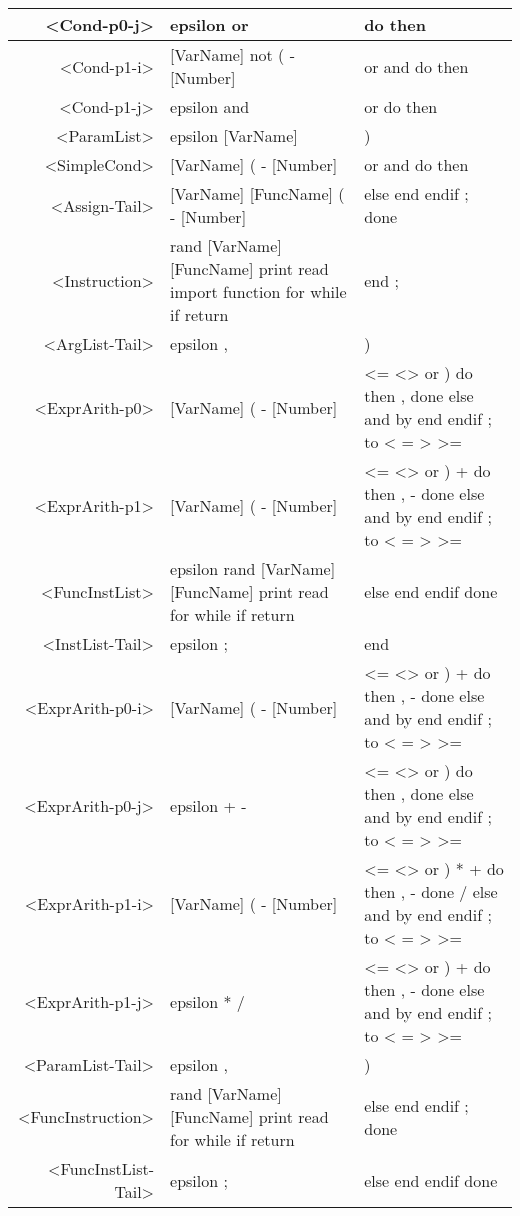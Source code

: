 \begin{longtable}{r p{7cm} p{7cm}}
<Cond-p0-j> & epsilon or  & do then \\ \hline
<Cond-p1-i> & [VarName] not ( - [Number]  & or and do then \\ \hline
<Cond-p1-j> & epsilon and  & or do then \\ \hline
<ParamList> & epsilon [VarName]  & ) \\ \hline
<SimpleCond> & [VarName] ( - [Number]  & or and do then \\ \hline
<Assign-Tail> & [VarName] [FuncName] ( - [Number]  & else end endif ; done \\ \hline
<Instruction> & rand [VarName] [FuncName] print read import function for while if return  & end ; \\ \hline
<ArgList-Tail> & epsilon ,  & ) \\ \hline
<ExprArith-p0> & [VarName] ( - [Number]  & <= <> or ) do then , done else and by end endif ; to < = > >= \\ \hline
<ExprArith-p1> & [VarName] ( - [Number]  & <= <> or ) + do then , - done else and by end endif ; to < = > >= \\ \hline
<FuncInstList> & epsilon rand [VarName] [FuncName] print read for while if return  & else end endif done \\ \hline
<InstList-Tail> & epsilon ;  & end \\ \hline
<ExprArith-p0-i> & [VarName] ( - [Number]  & <= <> or ) + do then , - done else and by end endif ; to < = > >= \\ \hline
<ExprArith-p0-j> & epsilon + -  & <= <> or ) do then , done else and by end endif ; to < = > >= \\ \hline
<ExprArith-p1-i> & [VarName] ( - [Number]  & <= <> or ) * + do then , - done / else and by end endif ; to < = > >= \\ \hline
<ExprArith-p1-j> & epsilon * /  & <= <> or ) + do then , - done else and by end endif ; to < = > >= \\ \hline
<ParamList-Tail> & epsilon ,  & ) \\ \hline
<FuncInstruction> & rand [VarName] [FuncName] print read for while if return  & else end endif ; done \\ \hline
<FuncInstList-Tail> & epsilon ;  & else end endif done 
\end{longtable}

